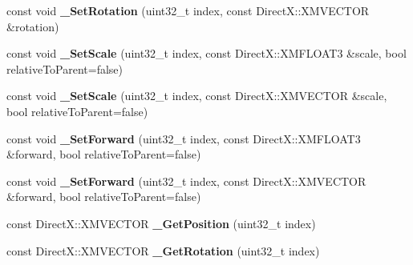 \begin{DoxyCompactItemize}
\item 
const void {\bfseries \+\_\+\+Set\+Rotation} (uint32\+\_\+t index, const Direct\+X\+::\+X\+M\+V\+E\+C\+T\+OR \&rotation)\hypertarget{class_ensum_1_1_components_1_1_transform_manager_a4bc5b1864100fc3cf85fe50d8719f07e}{}\label{class_ensum_1_1_components_1_1_transform_manager_a4bc5b1864100fc3cf85fe50d8719f07e}

\item 
const void {\bfseries \+\_\+\+Set\+Scale} (uint32\+\_\+t index, const Direct\+X\+::\+X\+M\+F\+L\+O\+A\+T3 \&scale, bool relative\+To\+Parent=false)\hypertarget{class_ensum_1_1_components_1_1_transform_manager_a0c99c23b7e4329a4717021394fa9e4b9}{}\label{class_ensum_1_1_components_1_1_transform_manager_a0c99c23b7e4329a4717021394fa9e4b9}

\item 
const void {\bfseries \+\_\+\+Set\+Scale} (uint32\+\_\+t index, const Direct\+X\+::\+X\+M\+V\+E\+C\+T\+OR \&scale, bool relative\+To\+Parent=false)\hypertarget{class_ensum_1_1_components_1_1_transform_manager_a77af7e15d39f11c5a5ea9608d36aab3a}{}\label{class_ensum_1_1_components_1_1_transform_manager_a77af7e15d39f11c5a5ea9608d36aab3a}

\item 
const void {\bfseries \+\_\+\+Set\+Forward} (uint32\+\_\+t index, const Direct\+X\+::\+X\+M\+F\+L\+O\+A\+T3 \&forward, bool relative\+To\+Parent=false)\hypertarget{class_ensum_1_1_components_1_1_transform_manager_a4d23fb876a394beb48d2c11531215897}{}\label{class_ensum_1_1_components_1_1_transform_manager_a4d23fb876a394beb48d2c11531215897}

\item 
const void {\bfseries \+\_\+\+Set\+Forward} (uint32\+\_\+t index, const Direct\+X\+::\+X\+M\+V\+E\+C\+T\+OR \&forward, bool relative\+To\+Parent=false)\hypertarget{class_ensum_1_1_components_1_1_transform_manager_af6e6e9cd9eb807841adb9828c5e0fa8e}{}\label{class_ensum_1_1_components_1_1_transform_manager_af6e6e9cd9eb807841adb9828c5e0fa8e}

\item 
const Direct\+X\+::\+X\+M\+V\+E\+C\+T\+OR {\bfseries \+\_\+\+Get\+Position} (uint32\+\_\+t index)\hypertarget{class_ensum_1_1_components_1_1_transform_manager_a96b1da90d26422c620abaab2f3d496fc}{}\label{class_ensum_1_1_components_1_1_transform_manager_a96b1da90d26422c620abaab2f3d496fc}

\item 
const Direct\+X\+::\+X\+M\+V\+E\+C\+T\+OR {\bfseries \+\_\+\+Get\+Rotation} (uint32\+\_\+t index)\hypertarget{class_ensum_1_1_components_1_1_transform_manager_af09798cd8daa7a687e384004ebf697f5}{}\label{class_ensum_1_1_components_1_1_transform_manager_af09798cd8daa7a687e384004ebf697f5}


\end{DoxyCompactItemize}
